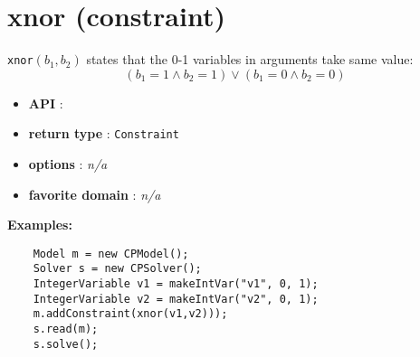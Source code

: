 \label{xnor}
\hypertarget{xnor}{}

\section{xnor (constraint)}\label{xnor:xnorconstraint}\hypertarget{xnor:xnorconstraint}{}
\begin{notedef}
    \texttt{xnor}$(b_1,b_2)$ states that the 0-1 variables in arguments take same value:
$$ (b_1=1 \land b_2=1) \lor (b_1=0 \land b_2=0)$$
\end{notedef}

\begin{itemize}
    \item \textbf{API} : 
	\item \textbf{return type} : \texttt{Constraint}
	\item \textbf{options} : \emph{n/a}
	\item \textbf{favorite domain} : \emph{n/a}
\end{itemize}

\textbf{Examples:}
\begin{lstlisting}
	Model m = new CPModel();
	Solver s = new CPSolver();
	IntegerVariable v1 = makeIntVar("v1", 0, 1);
	IntegerVariable v2 = makeIntVar("v2", 0, 1);
	m.addConstraint(xnor(v1,v2)));
	s.read(m);
	s.solve();
\end{lstlisting}
